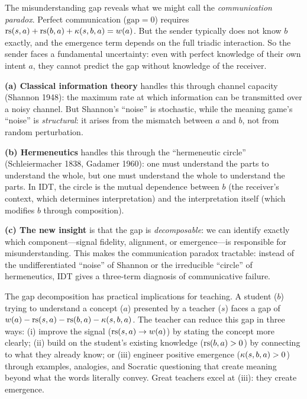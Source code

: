 \begin{interpretation}
The misunderstanding gap reveals what we might call the \emph{communication
paradox}. Perfect communication ($\mathrm{gap} = 0$) requires
$\mathrm{rs}(s, a) + \mathrm{rs}(b, a) + \kappa(s, b, a) = w(a)$. But the sender
typically does not know $b$ exactly, and the emergence term depends on
the full triadic interaction. So the sender faces a fundamental
uncertainty: even with perfect knowledge of their own intent $a$, they
cannot predict the gap without knowledge of the receiver.

\textbf{(a) Classical information theory} handles this through channel
capacity (Shannon 1948): the maximum rate at which information can be
transmitted over a noisy channel. But Shannon's ``noise'' is stochastic,
while the meaning game's ``noise'' is \emph{structural}: it arises from
the mismatch between $a$ and $b$, not from random perturbation.

\textbf{(b) Hermeneutics} handles this through the ``hermeneutic circle''
(Schleiermacher 1838, Gadamer 1960): one must understand the parts to
understand the whole, but one must understand the whole to understand the
parts. In IDT, the circle is the mutual dependence between $b$ (the
receiver's context, which determines interpretation) and the interpretation
itself (which modifies $b$ through composition).

\textbf{(c) The new insight} is that the gap is \emph{decomposable}: we can
identify exactly which component---signal fidelity, alignment, or
emergence---is responsible for misunderstanding. This makes the communication
paradox tractable: instead of the undifferentiated ``noise'' of Shannon or
the irreducible ``circle'' of hermeneutics, IDT gives a three-term
diagnosis of communicative failure.
\end{interpretation}

\begin{remark}
The gap decomposition has practical implications for teaching. A student
($b$) trying to understand a concept ($a$) presented by a teacher ($s$)
faces a gap of $w(a) - \mathrm{rs}(s, a) - \mathrm{rs}(b, a) - \kappa(s, b, a)$.
The teacher can reduce this gap in three ways: (i) improve the signal
($\mathrm{rs}(s, a) \to w(a)$) by stating the concept more clearly; (ii) build
on the student's existing knowledge ($\mathrm{rs}(b, a) > 0$) by connecting to
what they already know; or (iii) engineer positive emergence
($\kappa(s, b, a) > 0$) through examples, analogies, and Socratic
questioning that create meaning beyond what the words literally convey.
Great teachers excel at (iii): they create emergence.
\end{remark}



